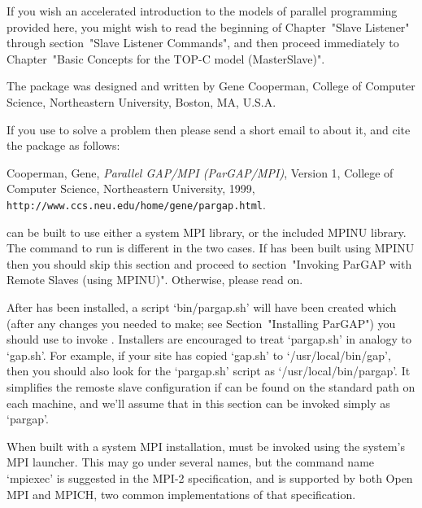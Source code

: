 If you wish  an  accelerated  introduction  to  the  models  of  parallel
programming provided here, you  might  wish  to  read  the  beginning  of
Chapter~"Slave Listener" through section~"Slave Listener  Commands",  and
then proceed immediately to Chapter~"Basic Concepts for the  TOP-C  model
(MasterSlave)".


The {\ParGAP} package was designed and written by Gene Cooperman, College
of Computer Science, Northeastern University, Boston, MA, U.S.A.

If you use {\ParGAP} to solve a problem then please send a short email to
 about it, and cite  the  {\ParGAP}  package  as
follows:

\begintt
{}
      Cooperman, Gene,
      {\sl Parallel GAP/MPI (ParGAP/MPI)}, Version 1,
      College of Computer Science, Northeastern University, 1999,
      \verb+http://www.ccs.neu.edu/home/gene/pargap.html+.
\endtt


{\ParGAP} can be built to use either a system MPI library, or the included
MPINU library. The command to run {\ParGAP} is different in the two cases.
If {\ParGAP} has been built using MPINU then you should skip this section
and proceed to section~"Invoking ParGAP with Remote Slaves (using MPINU)".
Otherwise, please read on.

After {\ParGAP} has been installed, a script `bin/pargap.sh' will have been
created  which   (after   any   changes   you   needed   to   make;   see
Section~"Installing ParGAP") you should use to invoke {\ParGAP}. Installers 
are encouraged to treat `pargap.sh' in analogy to `gap.sh'. For example, if 
your site  has  copied  `gap.sh'  to `/usr/local/bin/gap', then you should
also look for the `pargap.sh' script as `/usr/local/bin/pargap'. It simplifies
the remoste slave configuration if {\ParGAP} can be found on the standard
path on each machine, and we'll assume that in this section {\ParGAP} can
be invoked simply as `pargap'.

When built with a system MPI installation, {\ParGAP} must be invoked using
the system's MPI launcher. This may go under several names, but the command
name `mpiexec' is suggested in the MPI-2 specification, and is supported by 
both Open MPI and MPICH, two common implementations of that specification.

